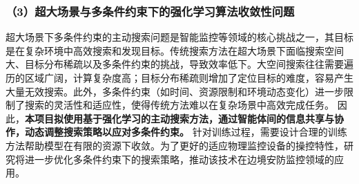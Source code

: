 \subsubsection*{\bfseries （3）超大场景与多条件约束下的强化学习算法收敛性问题}

超大场景下多条件约束的主动搜索问题是智能监控等领域的核心挑战之一，其目标是在复杂环境中高效搜索和发现目标。传统搜索方法在超大场景下面临搜索空间大、目标分布稀疏以及多条件约束的挑战，导致效率低下。大空间搜索往往需要遍历的区域广阔，计算复杂度高；目标分布稀疏则增加了定位目标的难度，容易产生大量无效搜索。此外，多条件约束（如时间、资源限制和环境动态变化）进一步限制了搜索的灵活性和适应性，使得传统方法难以在复杂场景中高效完成任务。
因此，\textbf{本项目拟使用基于强化学习的主动搜索方法，通过智能体间的信息共享与协作，动态调整搜索策略以应对多条件约束。} 针对训练过程，需要设计合理的训练方法帮助模型在有限的资源下收敛。为了更好的适应物理监控设备的操控特性，研究将进一步优化多条件约束下的搜索策略，推动该技术在边境安防监控领域的应用。